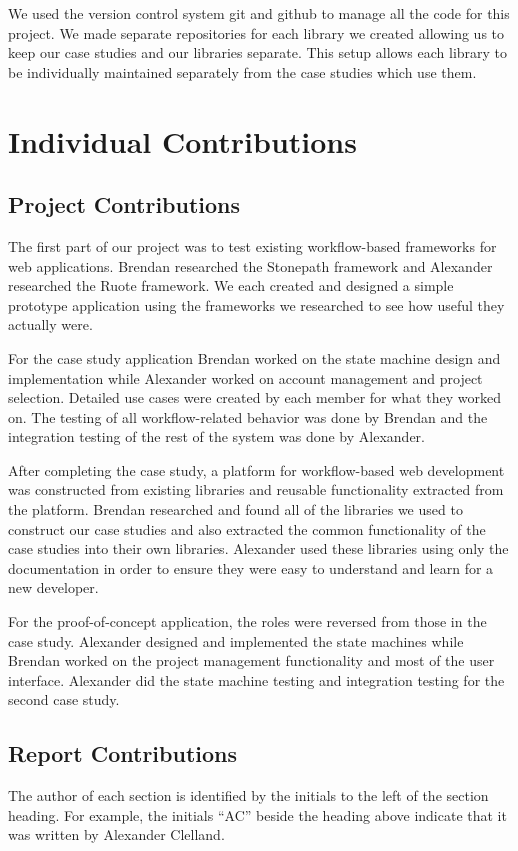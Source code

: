 \documentclass[document.tex]{subfiles}
\begin{document}
We used the version control system git \cite{git} and github \cite{github} to manage all the code for this project. We made separate repositories for each library we created allowing us to keep our case studies and our libraries separate. This setup allows each library to be individually  maintained separately from the case studies which use them. 


\section{Individual Contributions}

\subsection{Project Contributions}

The first part of our project was to test existing workflow-based frameworks for web applications. Brendan researched the Stonepath framework and Alexander researched the Ruote framework. We each created and designed a simple prototype application using the frameworks we researched to see how useful they actually were.

For the case study application Brendan worked on the state machine design and implementation while Alexander worked on account management and project selection. Detailed use cases were created by each member for what they worked on. The testing of all workflow-related behavior was done by Brendan and the integration testing of the rest of the system was done by Alexander.

After completing the case study, a platform for workflow-based web development was constructed from existing libraries and reusable functionality extracted from the platform. Brendan researched and found all of the libraries we used to construct our case studies and also extracted the common functionality of the case studies into their own libraries. Alexander used these libraries using only the documentation in order to ensure they were easy to understand and learn for a new developer.

For the proof-of-concept application, the roles were reversed from those in the case study. Alexander designed and implemented the state machines while Brendan worked on the project management functionality and most of the user interface. Alexander did the state machine testing and integration testing for the second case study.

\subsection{Report Contributions}

The author of each section is identified by the initials to the left of the section heading. For example, the initials ``AC'' beside the heading above indicate that it was written by Alexander Clelland.
\end{document}
